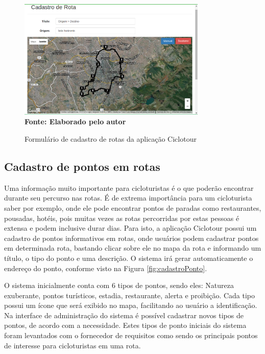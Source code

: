 \begin{figure}[!ht]
	\centering	
	\caption[\hspace{0.1cm} Cadastro de Rotas da aplicação Ciclotour.]
	{Formulário de cadastro de rotas da aplicação Ciclotour}
	  \vspace{-0.4cm}
	\includegraphics[width=0.8\textwidth]{figuras/cadastroRotas.png}
	 \vspace{0cm}
	\\\textbf{\footnotesize Fonte: Elaborado pelo autor}
	\label{fig:cadastroRotas}
\end{figure}

\subsection{Cadastro de pontos em rotas}
Uma informação muito importante para cicloturistas é o que poderão encontrar durante seu percurso nas rotas. É de extrema importância para um 
cicloturista saber por exemplo, onde ele pode encontrar pontos de paradas como restaurantes, pousadas, hotéis, pois muitas vezes as rotas percorridas
por estas pessoas é extensa e podem inclusive durar dias. Para isto, a aplicação Ciclotour possui um cadastro de pontos informativos em rotas, onde
usuários podem cadastrar pontos em determinada rota, bastando clicar sobre ele no mapa da rota e informando um título, o tipo do ponto e uma 
descrição. O sistema irá gerar automaticamente o endereço do ponto, conforme visto na Figura \ref{fig:cadastroPonto}. 

O sistema inicialmente conta com 6 tipos de pontos, sendo eles: Natureza exuberante, pontos turísticos, estadia, restaurante, alerta e proibição. 
Cada tipo possui um ícone que será exibido no mapa, facilitando ao usuário a identificação. Na interface de administração do sistema é possível 
cadastrar novos tipos de pontos, de acordo com a necessidade. Estes tipos de ponto iniciais do sistema foram levantados com o fornecedor de 
requisitos como sendo os principais pontos de interesse para cicloturistas em uma rota.

